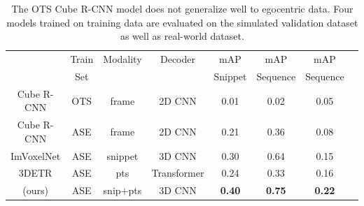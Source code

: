 
\begin{table}[]
    \centering
    \begin{tabular}{c|c|c|c| c|c|c|c|}
           & Train & Modality & Decoder & \ASE{} mAP & \ASE{} mAP & \AOThree{} mAP \\ 
           & Set   &          &         & Snippet  & Sequence  &  Sequence  \\ \hline    
        Cube R-CNN   &  OTS & frame & 2D CNN & 0.01 & 0.02 & 0.05 \\ \hline
        Cube R-CNN   &  ASE & frame & 2D CNN& 0.21 & 0.36 & 0.08 \\ 
        ImVoxelNet & ASE & snippet& 3D CNN  & 0.30 & 0.64 & 0.15 \\ 
        3DETR       &  ASE   & pts & Transformer & 0.24 & 0.33 & 0.16 \\
        \EFMmodel{} (ours)  &    ASE        & snip$+$pts & 3D CNN & \textbf{0.40} & \textbf{0.75} & \textbf{0.22} \\  %
    \end{tabular}
    \caption{The OTS Cube R-CNN model does not generalize well to egocentric data. 
    Four models trained on \ASE{} training data are evaluated on the simulated \ASE{} validation dataset as well as real-world \AOThree{} dataset. }
    \label{tab:obj_det_perf}
    
\end{table}


